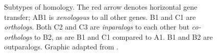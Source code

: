 \begin{figure}[h]
	\centering
	\def\svgwidth{0.8\textwidth}
	
	\caption[Orthology, paralogy, and xenology]{Subtypes of homology. The red
		arrow denotes horizontal gene transfer; AB1 is \emph{xenologous} to all
		other genes. B1 and C1 are \emph{orthologs}. Both C2 and C3 are
		\emph{inparalogs} to each other but \emph{co-orthologs} to B2, as are B1 and
		C1 compared to A1. B1 and B2 are outparalogs. Graphic adapted from
		\citet{fitch2000}.
	}
	\label{fig:orthology}
\end{figure}
